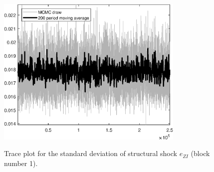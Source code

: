 \begin{figure}[H]
\centering
  \includegraphics[width=0.8\textwidth]{BRS_growth_ext_comovement/graphs/TracePlot_SE_e_ZI_blck_1}\\
    \caption{Trace plot for the standard deviation of structural shock ${e_{ZI}}$ (block number 1).}
\end{figure}
